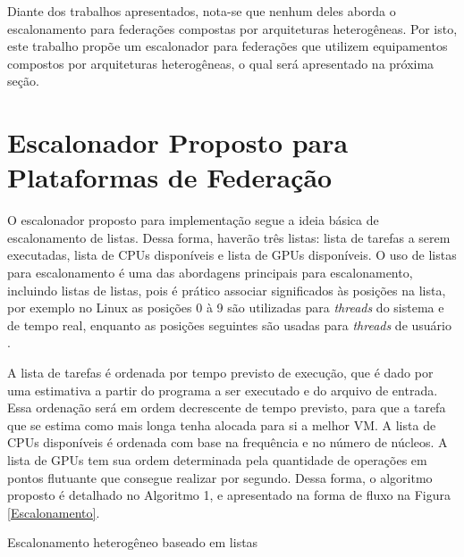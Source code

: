 Diante dos trabalhos apresentados, nota-se que nenhum deles aborda o escalonamento para federações compostas por arquiteturas heterogêneas. Por isto, este trabalho propõe um escalonador para federações que utilizem equipamentos compostos por arquiteturas heterogêneas, o qual será apresentado na próxima seção.

\section{Escalonador Proposto para Plataformas de Federação}

O escalonador proposto para implementação segue a ideia básica de escalonamento de listas. Dessa forma, haverão três listas: lista de tarefas a serem executadas, lista de \acrshort{CPU}s disponíveis e lista de \acrshort{GPU}s disponíveis. O uso de listas para escalonamento é uma das abordagens principais para escalonamento, incluindo listas de listas\cite{MultilevelFQ}, pois é prático associar significados às posições na lista, por exemplo no Linux as posições 0 à 9 são utilizadas para \textit{threads} do sistema e de tempo real, enquanto as posições seguintes são usadas para \textit{threads} de usuário \cite{KernelsComp}.

A lista de tarefas é ordenada por tempo previsto de execução, que é dado por uma estimativa a partir do programa a ser executado e do arquivo de entrada. Essa ordenação será em ordem decrescente de tempo previsto, para que a tarefa que se estima como mais longa tenha alocada para si a melhor \acrshort{VM}. A lista de \acrshort{CPU}s disponíveis é ordenada com base na frequência e no número de núcleos. A lista de \acrshort{GPU}s tem sua ordem determinada pela quantidade de operações em pontos flutuante que consegue realizar por segundo. Dessa forma, o algoritmo proposto é detalhado no Algoritmo 1, e apresentado na forma de fluxo na Figura \ref{Escalonamento}.

\begin{algorithm}
\caption{Escalonamento heterogêneo baseado em listas}
\begin{algorithmic}
			\Else
			\EndIf
		\Else
		\EndIf
	\EndWhile
\EndProcedure
\end{algorithmic}
\end{algorithm}

